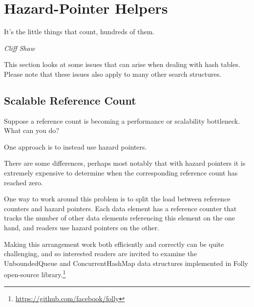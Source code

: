 
\section{Hazard-Pointer Helpers}
\label{sec:together:Hazard-Pointer Helpers}
%
\epigraph{It's the little things that count, hundreds of them.}
	 {\emph{Cliff Shaw}}

This section looks at some issues that can arise when dealing with
hash tables.
Please note that these issues also apply to many other search structures.

\subsection{Scalable Reference Count}
\label{sec:together:Scalable Reference Count}

Suppose a reference count is becoming a performance or scalability
bottleneck.
What can you do?

One approach is to instead use hazard pointers.

There are some differences, perhaps most notably that with
hazard pointers it is extremely expensive to determine when
the corresponding reference count has reached zero.

One way to work around this problem is to split the load between
reference counters and hazard pointers.
Each data element has a reference counter that tracks the number
of other data elements referencing this element on the one hand,
and readers use hazard pointers on the other.

Making this arrangement work both efficiently and correctly can be
quite challenging, and so interested readers are invited to examine
the UnboundedQueue and ConcurrentHashMap data structures implemented in
Folly open-source library.\footnote{
	\url{https://github.com/facebook/folly}}



